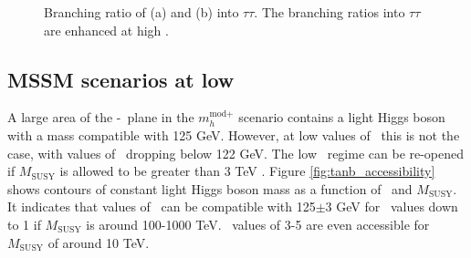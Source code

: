 \begin{figure}[h!]
\begin{center}
\end{center}
\caption{Branching ratio of (a) \PHiggs and (b) \PHiggsps into $\tau\tau$. The branching
ratios into $\tau\tau$ are enhanced at high \tanb.}
\label{fig:mhmodp_br}
\end{figure}


\subsection{MSSM scenarios at low \tanb}
\label{sec:mssm_theory_lowtb}
A large area of the \mA-\tanb~plane in the $m_{h}^{\text{mod+}}$ 
scenario contains a light Higgs boson with a mass compatible with
125 GeV. However, at low values of \tanb~this is not the case, with
values of \mh~dropping below 122 GeV. The low \tanb~regime can be re-opened
if $M_{\text{SUSY}}$ is allowed to be greater than 3 TeV \cite{MSSM-reopen}. 
Figure \ref{fig:tanb_accessibility} shows contours of constant
light Higgs boson mass as a function of \tanb~and $M_{\text{SUSY}}$.
It indicates that values of \mh~can be compatible with 125$\pm$3 GeV
for \tanb~values down to 1 if $M_{\text{SUSY}}$ is around 100-1000 TeV. 
\tanb~values of 3-5 are even accessible for $M_{\text{SUSY}}$ of around 10 TeV.

